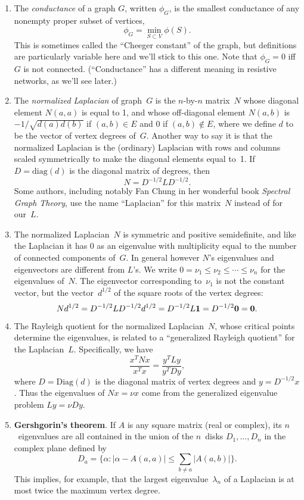\documentclass[11pt]{article}
\newcommand{\m}[1]{{\bf{#1}}}       %
\newcommand{\ones}{\m1}             %
\newcommand{\zeros}{\m0}            %
\newcommand{\diag}{\mbox{diag}}
\newcommand{\Diag}{\mbox{Diag}}
\begin{document}
\begin{enumerate}
\item
The {\em conductance} of a graph $G$,
written $\phi_G$, is the smallest conductance of any nonempty 
proper subset of vertices,
$$\phi_G = \min_{S\subset V}\phi(S).$$
This is sometimes called the ``Cheeger constant''
of the graph, but definitions are particularly
variable here and we'll stick to this one.
Note that $\phi_G=0$ iff $G$ is not connected.
(``Conductance'' has a different meaning in resistive networks, as we'll see later.)

\item\label{nlap}
The {\em normalized Laplacian} of graph~$G$ is 
the $n$-by-$n$ matrix~$N$
whose diagonal element $N(a,a)$ is equal to 1,
and whose off-diagonal element $N(a,b)$ 
is~$-1/\sqrt{d(a)d(b)}$ if $(a,b) \in E$ and $0$ if $(a,b) \notin E$,
where we define $d$ to be the vector of vertex degrees of~$G$.
Another way to say it is that the normalized Laplacian is 
the (ordinary) Laplacian with rows and columns scaled symmetrically 
to make the diagonal elements equal to~1. 
If $D=\diag(d)$ is the diagonal matrix of degrees, 
then 
$$N = D^{-1/2}LD^{-1/2}.$$
Some authors, including notably Fan Chung in her 
wonderful book {\em Spectral Graph Theory}, 
use the name ``Laplacian'' for this matrix~$N$
instead of for our~$L$.

\item\label{nlapeig}
The normalized Laplacian~$N$ is symmetric and 
positive semidefinite, and like the Laplacian
it has 0 as an eigenvalue with multiplicity
equal to the number of connected components
of~$G$.  In general however $N$'s eigenvalues
and eigenvectors are different from $L$'s.
We write $0=\nu_1\le\nu_2\le\cdots\le\nu_n$
for the eigenvalues of~$N$.
The eigenvector corresponding to~$\nu_1$ is
not the constant vector, but the vector~$d^{1/2}$
of the square roots of the vertex degrees:
$$Nd^{1/2} = D^{-1/2}LD^{-1/2}d^{1/2} = D^{-1/2}L\ones = D^{-1/2}\zeros = \zeros.$$

\item\label{nlaprq}
The Rayleigh quotient for the normalized Laplacian~$N$, 
whose critical points determine the eigenvalues,
is related to a ``generalized Rayleigh quotient'' for the Laplacian~$L$.
Specifically, we have
$$\frac{x^TNx}{x^Tx} = \frac{y^TLy}{y^TDy},$$
where $D=\Diag(d)$ is the diagonal matrix of vertex degrees 
and $y=D^{-1/2}x$.
Thus the eigenvalues of $Nx=\nu x$ come from
the generalized eigenvalue problem $Ly=\nu Dy.$

\item\label{gershgorin}{\bf Gershgorin's theorem}.
If $A$ is any square matrix (real or complex), its $n$~eigenvalues are all contained
in the union of the $n$~disks $D_1,\ldots,D_n$ in the complex plane defined by
$$D_a = \{\alpha : |\alpha-A(a,a)| \leq \sum_{b\neq a}|A(a,b)|\}.$$
This implies, for example, that the largest eigenvalue~$\lambda_n$ of a Laplacian
is at most twice the maximum vertex degree.


\end{enumerate}
\end{document}
